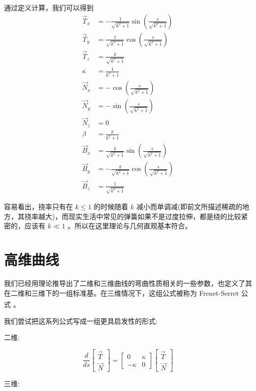 \documentclass[fontset=windows]{article}
\newcommand{\upcite}[1]{\textsuperscript{\cite{#1}}}
\begin{document}
通过定义计算，我们可以得到
$$
\begin{aligned}
    \vec{T}_x &= -\frac1{\sqrt{k^2 + 1}} \sin(\frac{s}{\sqrt{k^2 + 1}}) \\
    \vec{T}_y &=  \frac1{\sqrt{k^2 + 1}} \cos(\frac{s}{\sqrt{k^2 + 1}}) \\
    \vec{T}_z &= \frac{k}{\sqrt{k^2 + 1}} \\
    \kappa    &= \frac{1}{k^2 + 1} \\
    \vec{N}_x &= -\cos(\frac{s}{\sqrt{k^2 + 1}}) \\
    \vec{N}_y &= -\sin(\frac{s}{\sqrt{k^2 + 1}}) \\
    \vec{N}_z &= 0 \\
    \beta     &= \frac{k}{k^2 + 1}  \\
    \vec{B}_x &=  \frac{k}{\sqrt{k^2 + 1}} \sin(\frac{s}{\sqrt{k^2 + 1}}) \\
    \vec{B}_y &= -\frac{k}{\sqrt{k^2 + 1}} \cos(\frac{s}{\sqrt{k^2 + 1}}) \\
    \vec{B}_z &= \frac{1}{\sqrt{k^2 + 1}}
\end{aligned}
$$

容易看出，挠率只有在 $k \le 1$ 的时候随着 $k$ 减小而单调减(即前文所描述稀疏的地方，其挠率越大)，而现实生活中常见的弹簧如果不是过度拉伸，都是绕的比较紧密的，应该有 $k \ll 1$ 。所以在这里理论与几何直观基本符合。

\section{高维曲线}

我们已经用理论推导出了二维和三维曲线的弯曲性质相关的一些参数，也定义了其在二维和三维下的一组标准基。在三维情况下，这组公式被称为 Frenet-Serret 公式 \upcite{ref3}。

我们尝试把这系列公式写成一组更具启发性的形式:

二维:

$$
\frac{d}{ds}
\begin{bmatrix}
    \vec{T} \\
    \vec{N}
\end{bmatrix} = 
\begin{bmatrix}
    0 & \kappa \\
    -\kappa & 0 
\end{bmatrix}
\begin{bmatrix}
    \vec{T}  \\
    \vec{N}
\end{bmatrix}
$$

三维:
\end{document}
